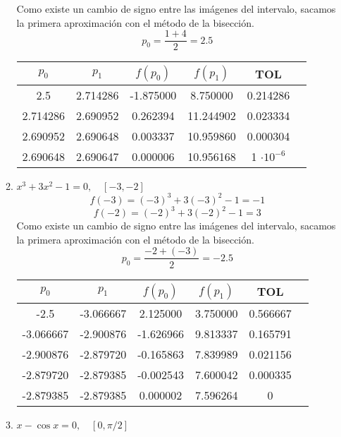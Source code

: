 \documentclass[12pt]{article}
\begin{document}
\begin{enumerate}
\begin{enumerate}
        Como existe un cambio de signo entre las imágenes del intervalo, sacamos la primera aproximación con el método de la bisección.
        \[p_0 = \frac{1+4}{2} = 2.5\]
        
        \begin{center}
        \begin{tabular}{|c|c|c|c|c|c|}
        \hline
        \(p_0\) & \(p_1\) & \(f(p_0)\) & \(f(p_1)\) & \textbf{TOL} \\
        \hline
        2.5 & 2.714286 & -1.875000 & 8.750000 &  0.214286 \\
        2.714286 & 2.690952 & 0.262394 & 11.244902 &  0.023334 \\
        2.690952 & 2.690648 & 0.003337 & 10.959860 &  0.000304 \\
        2.690648 & 2.690647 & 0.000006 & 10.956168 &  1 \(\cdot 10^{-6}\) \\
        \hline 
        \end{tabular}
        \end{center}

        \item \( x^3 + 3x^2 - 1 = 0, \quad [-3,-2] \)
        \[f(-3) = (-3)^3 + 3(-3)^2 - 1 = -1\]
        \[f(-2) = (-2)^3 + 3(-2)^2 - 1 = 3\]
         Como existe un cambio de signo entre las imágenes del intervalo, sacamos la primera aproximación con el método de la bisección.
         \[p_0 = \frac{-2+(-3)}{2} = -2.5\]

        \begin{center}
        \begin{tabular}{|c|c|c|c|c|c|}
        \hline
        \(p_0\) & \(p_1\) & \(f(p_0)\) & \(f(p_1)\) & \textbf{TOL} \\
        \hline
        -2.5 & -3.066667 & 2.125000 & 3.750000 &  0.566667 \\
        -3.066667 & -2.900876 & -1.626966 & 9.813337 &  0.165791 \\
        -2.900876 & -2.879720 & -0.165863 & 7.839989 &  0.021156 \\
        -2.879720 & -2.879385 & -0.002543 & 7.600042 &  0.000335 \\
        -2.879385 & -2.879385 & 0.000002 & 7.596264 &  0 \\
        \hline 
        \end{tabular}
        \end{center}

        \item \( x - \cos x = 0, \quad [0, \pi/2] \)
        

\end{enumerate}
\end{enumerate}
\end{document}
